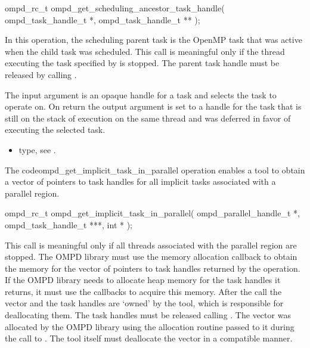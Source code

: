 \format

\begin{cspecific}
\begin{ompSyntax}
ompd_rc_t ompd_get_scheduling_ancestor_task_handle(
  ompd_task_handle_t *,
  ompd_task_handle_t **
);
\end{ompSyntax}
\end{cspecific}


\descr
In this operation, the scheduling parent task is the OpenMP task that was active when
the child task was scheduled. This call is meaningful only if the thread executing the task specified 
by   is stopped. The parent task handle must be released by calling 
.

\argdesc
The input argument  is an opaque handle for a task and selects the task to operate on.
On return the output argument  is set to a handle for the task that is 
still on the stack of execution on the same thread and was deferred in favor of executing the selected task.

\crossreferences
\begin{itemize}
	\item {} type, see .
\end{itemize}

\label{ompd:ompd_get_implicit_task_in_parallel}
\summary
The  code{ompd\_get\_implicit\_task\_in\_parallel}  operation enables a tool to obtain a 
vector of pointers to task handles for all implicit tasks associated with a parallel region.

\format

\begin{cspecific}
\begin{ompSyntax}
ompd_rc_t ompd_get_implicit_task_in_parallel(
  ompd_parallel_handle_t *,
  ompd_task_handle_t ***,
  int *
);
\end{ompSyntax}
\end{cspecific}


\descr
This call is meaningful only if all threads associated with the parallel region are stopped.
The OMPD library must use the memory allocation callback to obtain the memory for the vector of 
pointers to task handles returned by the operation. If the OMPD library needs to allocate 
heap memory for the task handles it returns, it must use the callbacks to acquire this memory.
After the call the vector and the task handles are `owned' by the tool, which is responsible for 
deallocating them. The task handles must be released calling .
The vector was allocated by the OMPD library using the
allocation routine passed to it during the call to .
The tool itself must deallocate the vector in a compatible manner.


